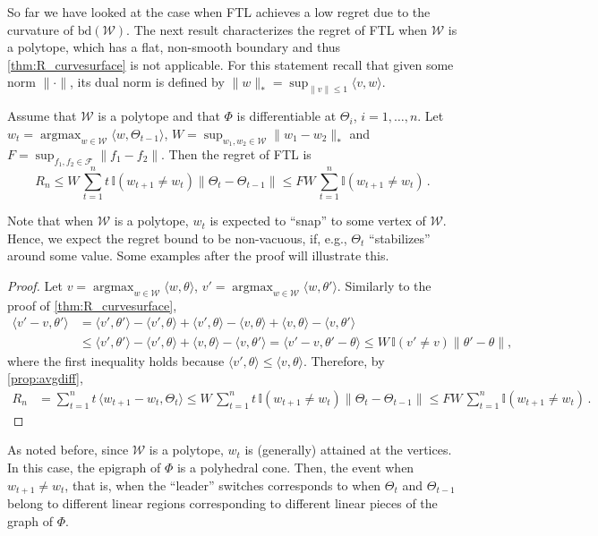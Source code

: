 \documentclass[english]{article}
\newcommand{\cW}{\mathcal{W}}
\newcommand{\cF}{\mathcal{F}}
\newcommand{\ind}{\mathbb{I}}
\newcommand{\inpro}[2]{\langle #1, #2\rangle}
\newcommand{\ip}[1]{\langle#1\rangle}
\newcommand{\norm}[1]{\left\| #1 \right\|}
\newcommand{\bd}{\mathrm{bd}}
\DeclareMathOperator*{\argmax}{argmax}
\begin{document}
So far we have looked at the case when FTL achieves a low regret due to the curvature of $\bd(\cW)$.
The next result characterizes the regret of FTL when $\cW$ is a polytope, which has a flat, non-smooth boundary and thus \cref{thm:R_curvesurface} is not applicable. 
For this statement recall that given some norm $\|\cdot\|$,  its dual norm is defined by $\|w\|_* = \sup_{\|v\|\le 1} \inpro{v}{w}$.
\begin{theorem}
	\label{thm:regretpolytope}
	Assume that $\cW$ is a polytope
	and that $\Phi$ is differentiable at $\Theta_i$, $i= 1, \ldots, n$. 
	Let $w_t = \argmax_{w\in\cW} \inpro{w}{\Theta_{t-1}}$,
	$W = \sup_{w_1,w_2\in\cW}\|w_1 - w_2\|_*$ and $F = \sup_{f_1,f_2\in \cF} \norm{f_1-f_2}$.
	 Then the regret of FTL is 
	\[
	R_n \le W\, \sum_{t=1}^{n} t \,\ind(w_{t+1}\neq w_{t})  \|\Theta_t - \Theta_{t-1}\| \le FW\,\sum_{t=1}^{n} \ind(w_{t+1}\neq w_{t})\,.
	\]
\end{theorem}
Note that when $\cW$ is a polytope, $w_t$ is expected to ``snap'' to some vertex of $\cW$. Hence, 
we expect the regret bound to be non-vacuous, if, e.g., $\Theta_t$ ``stabilizes'' around some value. Some examples after the 
proof will illustrate this.
\begin{proof}
Let $v \!=\! \argmax_{w\in\cW} \inpro{w}{\theta}$, $v'\!=\!\argmax_{w\in \cW}\ip{w,\theta'}$. 
Similarly to the proof of \cref{thm:R_curvesurface},
	\begin{align*}
	\inpro{v'-v}{\theta'} & = \inpro{v'}{\theta'} - \inpro{v'}{\theta} + \inpro{v'}{\theta} - \inpro{v}{\theta} + \inpro{v}{\theta} -\inpro{v}{\theta'} \\
	& \le \inpro{v'}{\theta'} - \inpro{v'}{\theta} + \inpro{v}{\theta} -\inpro{v}{\theta'} 
	= \inpro{v' - v}{\theta' - \theta} 
	\le W\,\ind(v'\neq v)\|\theta' - \theta \|,
	\end{align*}
	where the first inequality 
	holds because $\inpro{v'}{\theta} \le \inpro{v}{\theta}$.
	Therefore, by \eqref{prop:avgdiff}, 
	\begin{align*}
	R_n & = \sum_{t=1}^n t\,\ip{ w_{t+1}-w_t,\Theta_t} 
	 \le W\,\sum_{t=1}^{n} t\, \ind(w_{t+1}\!\neq\! w_{t})  \|\Theta_t - \Theta_{t-1}\| 
	 \le FW\,\sum_{t=1}^{n} \ind(w_{t+1}\!\neq\! w_{t})\,.
	\end{align*}
\end{proof}
As noted before,  since $\cW$ is a polytope, $w_t$ is (generally) attained at the vertices. 
In this case, the epigraph of $\Phi$  is a polyhedral cone. Then, the event when $w_{t+1}\neq w_{t}$, that is, when 
	the ``leader'' switches corresponds to when 
	$\Theta_{t}$ and $\Theta_{t-1}$ belong to different linear regions corresponding to different linear pieces of the graph of $\Phi$.
\end{document}
